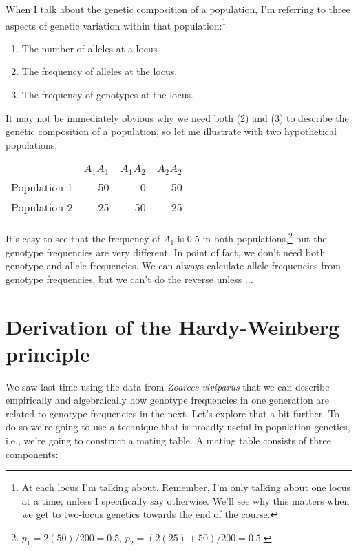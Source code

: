 \documentclass[12pt]{article}
\begin{document}
When I talk about the genetic composition of a population, I'm
referring to three aspects of genetic variation within that
population:\footnote{At each locus I'm talking about. Remember, I'm
  only talking about one locus at a time, unless I specifically say
  otherwise. We'll see why this matters when we get to two-locus
  genetics towards the end of the course.} 
\begin{enumerate}

\item The number of alleles at a locus.

\item The frequency of alleles at the locus.

\item The frequency of genotypes at the locus.

\end{enumerate}
It may not be immediately obvious why we need both (2) and
(3) to describe the genetic composition of a population, so let me
illustrate with two hypothetical populations:
\begin{center}
\begin{tabular}{lrrr}
             & $A_1A_1$ & $A_1A_2$ & $A_2A_2$ \\
Population 1 &       50 &        0 &       50 \\
Population 2 &       25 &       50 &       25 \\
\end{tabular}
\end{center}
It's easy to see that the frequency of $A_1$ is 0.5 in both
populations,\footnote{$p_1 = 2(50)/200 = 0.5$, $p_2 = (2(25) + 50)/200
= 0.5$.} but the genotype frequencies are very different. In point of
fact, we don't need both genotype and allele frequencies. We can
always calculate allele frequencies from genotype frequencies, but we
can't do the reverse unless $\dots$

\section*{Derivation of the Hardy-Weinberg principle}

We saw last time using the data from {\it Zoarces viviparus\/} that we
can describe empirically and algebraically how genotype frequencies in
one generation are related to genotype frequencies in the next. Let's
explore that a bit further. To do so we're going to use a technique
that is broadly useful in population genetics, i.e., we're going to
construct a mating table. A mating table consists of three
components:
\end{document}
